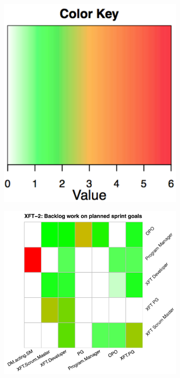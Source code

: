\begin{figure}
  \begin{subfigure}{.5\textwidth}
    \centering
    \includegraphics[width=.5\linewidth]{figures/heatmaps/colour-keys.pdf}
    \label{fig:hm-colourcodes}
  \end{subfigure}%
  \begin{subfigure}{.5\textwidth}
    \centering
    \includegraphics[width=.91\linewidth]{figures/heatmaps/picnic-_b_.pdf}
    \label{fig:hm-b-picnic}
  \end{subfigure}
  \begin{subfigure}{.5\textwidth}
    \centering

\end{subfigure}
\end{figure}

